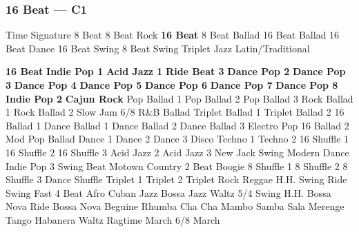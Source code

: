 \subsubsection[16 Beat]{16 Beat --- \UiKey{\II}\UiKey{\MET}C1}
Time Signature
8 Beat
8 Beat Rock
\textbf{16 Beat}
8 Beat Ballad
16 Beat Ballad
16 Beat Dance
16 Beat Swing
8 Beat Swing
Triplet
Jazz
Latin/Traditional





























\textbf{16 Beat}
\textbf{Indie Pop 1}
\textbf{Acid Jazz 1}
\textbf{Ride Beat 3}
\textbf{Dance Pop 2}
\textbf{Dance Pop 3}
\textbf{Dance Pop 4}
\textbf{Dance Pop 5}
\textbf{Dance Pop 6}
\textbf{Dance Pop 7}
\textbf{Dance Pop 8}
\textbf{Indie Pop 2}
\textbf{Cajun Rock}
Pop Ballad 1
Pop Ballad 2
Pop Ballad 3
Rock Ballad 1
Rock Ballad 2
Slow Jam
6/8 R\&B Ballad
Triplet Ballad 1
Triplet Ballad 2
16 Ballad 1
Dance Ballad 1
Dance Ballad 2
Dance Ballad 3
Electro Pop
16 Ballad 2
Mod Pop Ballad
Dance 1
Dance 2
Dance 3
Disco
Techno 1
Techno 2
16 Shuffle 1
16 Shuffle 2
16 Shuffle 3
Acid Jazz 2
Acid Jazz 3
New Jack Swing
Modern Dance
Indie Pop 3
Swing Beat
Motown
Country 2 Beat
Boogie
8 Shuffle 1
8 Shuffle 2
8 Shuffle 3
Dance Shuffle
Triplet 1
Triplet 2
Triplet Rock
Reggae
H.H. Swing
Ride Swing
Fast 4 Beat
Afro Cuban
Jazz Bossa
Jazz Waltz
5/4 Swing
H.H. Bossa Nova
Ride Bossa Nova
Beguine
Rhumba
Cha Cha
Mambo
Samba
Sala
Merenge
Tango
Habanera
Waltz
Ragtime
March
6/8 March
